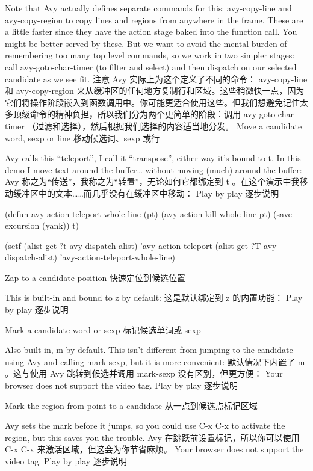 \documentclass[lang=cn,color=blue]{elegantbook}
\begin{document}
Note that Avy actually defines separate commands for this: avy-copy-line and avy-copy-region to copy lines and regions from anywhere in the frame. These are a little faster since they have the action stage baked into the function call. You might be better served by these. But we want to avoid the mental burden of remembering too many top level commands, so we work in two simpler stages: call avy-goto-char-timer (to filter and select) and then dispatch on our selected candidate as we see fit.
注意 Avy 实际上为这个定义了不同的命令： avy-copy-line 和 avy-copy-region 来从缓冲区的任何地方复制行和区域。这些稍微快一点，因为它们将操作阶段嵌入到函数调用中。你可能更适合使用这些。但我们想避免记住太多顶级命令的精神负担，所以我们分为两个更简单的阶段：调用 avy-goto-char-timer （过滤和选择），然后根据我们选择的内容适当地分发。
Move a candidate word, sexp or line
移动候选词、sexp 或行

Avy calls this “teleport”, I call it “transpose”, either way it’s bound to t. In this demo I move text around the buffer… without moving (much) around the buffer:
Avy 称之为“传送”，我称之为“转置”，无论如何它都绑定到 t 。在这个演示中我移动缓冲区中的文本……而几乎没有在缓冲区中移动：
Play by play  逐步说明

(defun avy-action-teleport-whole-line (pt)
    (avy-action-kill-whole-line pt)
    (save-excursion (yank)) t)

(setf (alist-get ?t avy-dispatch-alist) 'avy-action-teleport
      (alist-get ?T avy-dispatch-alist) 'avy-action-teleport-whole-line)

Zap to a candidate position
快速定位到候选位置

This is built-in and bound to z by default:
这是默认绑定到 z 的内置功能：
Play by play  逐步说明

Mark a candidate word or sexp
标记候选单词或 sexp

Also built in, m by default. This isn’t different from jumping to the candidate using Avy and calling mark-sexp, but it is more convenient:
默认情况下内置了 m 。这与使用 Avy 跳转到候选并调用 mark-sexp 没有区别，但更方便：
Your browser does not support the video tag.
Play by play  逐步说明

Mark the region from point to a candidate
从一点到候选点标记区域

Avy sets the mark before it jumps, so you could use C-x C-x to activate the region, but this saves you the trouble.
Avy 在跳跃前设置标记，所以你可以使用 C-x C-x 来激活区域，但这会为你节省麻烦。
Your browser does not support the video tag.
Play by play  逐步说明
\end{document}

